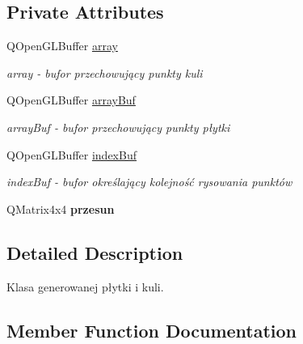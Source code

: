 \subsection*{Private Attributes}
\begin{DoxyCompactItemize}
\item 
\mbox{\label{classGeometryEngine_abcaed53af230d0e7284d40823910a305}} 
Q\+Open\+G\+L\+Buffer \hyperlink{classGeometryEngine_abcaed53af230d0e7284d40823910a305}{array}
\begin{DoxyCompactList}\small\item\em array -\/ bufor przechowujący punkty kuli \end{DoxyCompactList}\item 
\mbox{\label{classGeometryEngine_aab5b7d0e18e2244e36e6496b5d554d90}} 
Q\+Open\+G\+L\+Buffer \hyperlink{classGeometryEngine_aab5b7d0e18e2244e36e6496b5d554d90}{array\+Buf}
\begin{DoxyCompactList}\small\item\em array\+Buf -\/ bufor przechowujący punkty płytki \end{DoxyCompactList}\item 
\mbox{\label{classGeometryEngine_a83ff4486fd616b77012462add496234c}} 
Q\+Open\+G\+L\+Buffer \hyperlink{classGeometryEngine_a83ff4486fd616b77012462add496234c}{index\+Buf}
\begin{DoxyCompactList}\small\item\em index\+Buf -\/ bufor określający kolejność rysowania punktów \end{DoxyCompactList}\item 
\mbox{\label{classGeometryEngine_ae851274c37ac51d381d67fc93ecec6c0}} 
Q\+Matrix4x4 {\bfseries przesun}
\end{DoxyCompactItemize}


\subsection{Detailed Description}
Klasa generowanej płytki i kuli. 

\subsection{Member Function Documentation}
\mbox{\label{classGeometryEngine_a9668fa4c753c20e6a7aae1244213296f}} 
